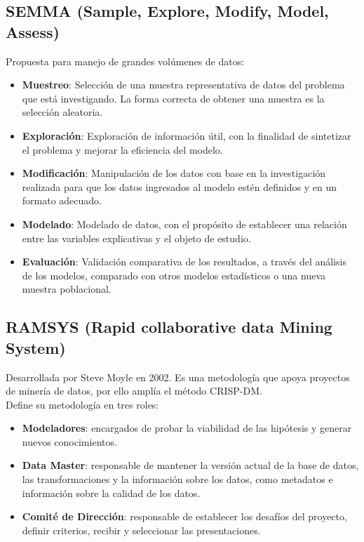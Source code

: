 \documentclass[12pt]{book}
\begin{document}
\subsection{SEMMA (Sample, Explore, Modify, Model, Assess)}
Propuesta para manejo de grandes volúmenes de datos:
\begin{itemize}
    \item \textbf{Muestreo}: Selección de una muestra representativa de datos del problema que está investigando. La forma correcta de obtener una muestra es la selección aleatoria.
    \item \textbf{Exploración}: Exploración de información útil, con la finalidad de sintetizar el problema y mejorar la eficiencia del modelo.
    \item \textbf{Modificación}: Manipulación de los datos con base en la investigación realizada para que los datos ingresados al modelo estén definidos y en un formato adecuado.
    \item \textbf{Modelado}: Modelado de datos, con el propósito de establecer una relación entre las variables explicativas y el objeto de estudio.
    \item \textbf{Evaluación}: Validación comparativa de los resultados, a través del análisis de los modelos, comparado con otros modelos estadísticos o una nueva muestra poblacional. 
\end{itemize}

\subsection{RAMSYS (Rapid collaborative data Mining System)}
Desarrollada por Steve Moyle en 2002. Es una metodología que apoya proyectos de minería de datos, por ello amplía el método CRISP-DM.\\
Define su metodología en tres roles:
\begin{itemize}
    \item \textbf{Modeladores}: encargados de probar la viabilidad de las hipótesis y generar nuevos conocimientos.
    \item \textbf{Data Master}: responsable de mantener la versión actual de la base de datos, las transformaciones y la información sobre los datos, como metadatos e información sobre la calidad de los datos.
    \item \textbf{Comité de Dirección}: responsable de establecer los desafíos del proyecto, definir criterios, recibir y seleccionar las presentaciones.
\end{itemize}
\end{document}
